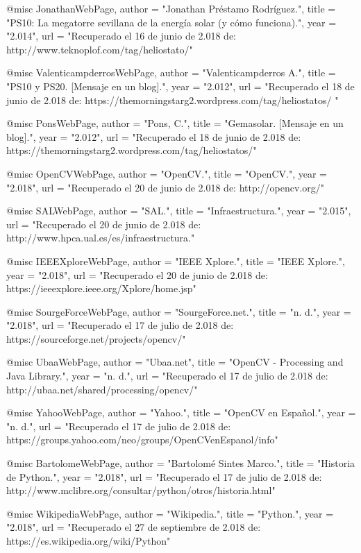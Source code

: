 \documentclass[12pt]{article}
\begin{document}
@misc{ JonathanWebPage,
	author = "Jonathan Préstamo Rodríguez.",
	title = "PS10: La megatorre sevillana de la energía solar (y cómo funciona).",
	year = "2.014",
	url = "Recuperado el 16 de junio de 2.018 de: http://www.teknoplof.com/tag/heliostato/"
}

@misc{ ValenticampderrosWebPage,
	author = "Valenticampderros A.",
	title = "PS10 y PS20. [Mensaje en un blog].",
	year = "2.012",
	url = "Recuperado el 18 de junio de 2.018 de: https://themorningstarg2.wordpress.com/tag/heliostatos/
"
}

@misc{ PonsWebPage,
	author = "Pons, C.",
	title = "Gemasolar. [Mensaje en un blog].",
	year = "2.012",
	url = "Recuperado el 18 de junio de 2.018 de: https://themorningstarg2.wordpress.com/tag/heliostatos/"
}

@misc{ OpenCVWebPage,
	author = "OpenCV.",
	title = "OpenCV.",
	year = "2.018",
	url = "Recuperado el 20 de junio de 2.018 de: http://opencv.org/"
}

@misc{ SALWebPage,
	author = "SAL.",
	title = "Infraestructura.",
	year = "2.015",
	url = "Recuperado el 20 de junio de 2.018 de: http://www.hpca.ual.es/es/infraestructura."
}

@misc{ IEEEXploreWebPage,
	author = "IEEE Xplore.",
	title = "IEEE Xplore.",
	year = "2.018",
	url = "Recuperado el 20 de junio de 2.018 de: https://ieeexplore.ieee.org/Xplore/home.jsp"
}

@misc{ SourgeForceWebPage,
	author = "SourgeForce.net.",
	title = "n. d.",
	year = "2.018",
	url = "Recuperado el 17 de julio de 2.018 de: https://sourceforge.net/projects/opencv/"
}

@misc{ UbaaWebPage,
	author = "Ubaa.net",
	title = "OpenCV - Processing and Java Library.",
	year = "n. d.",
	url = "Recuperado el 17 de julio de 2.018 de: http://ubaa.net/shared/processing/opencv/"
}

@misc{ YahooWebPage,
	author = "Yahoo.",
	title = "OpenCV en Español.",
	year = "n. d.",
	url = "Recuperado el 17 de julio de 2.018 de: https://groups.yahoo.com/neo/groups/OpenCVenEspanol/info"
}

@misc{ BartolomeWebPage,
	author = "Bartolomé Sintes Marco.",
	title = "Historia de Python.",
	year = "2.018",
	url = "Recuperado el 17 de julio de 2.018 de: http://www.mclibre.org/consultar/python/otros/historia.html"
}

@misc{ WikipediaWebPage,
	author = "Wikipedia.",
	title = "Python.",
	year = "2.018",
	url = "Recuperado el 27 de septiembre de 2.018 de: https://es.wikipedia.org/wiki/Python"
}
\end{document}
